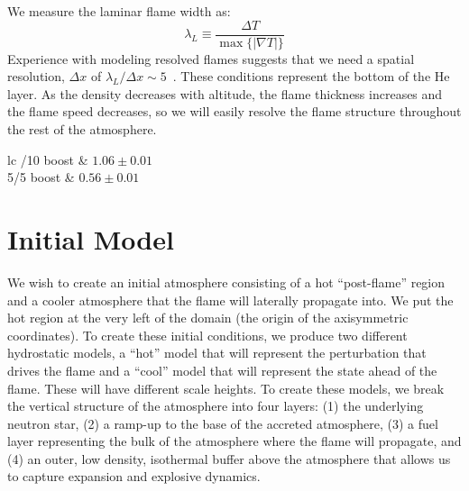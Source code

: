 \documentclass[preprint,times,tighten]{aastex63}
\begin{document}
We measure the laminar flame width as:
\begin{equation}
\lambda_L \equiv \frac{\Delta T}{\max\{|\nabla T|\}}
\end{equation}
Experience with modeling resolved flames suggests that we need a
spatial resolution, $\Delta x$ of $\lambda_L/\Delta x \sim 5$~\citep{SNld}.  These
conditions represent the bottom of the He layer.  As the density
decreases with altitude, the flame thickness increases and the flame
speed decreases, so we will easily resolve the flame structure throughout
the rest of the atmosphere.

\begin{deluxetable}{lc}
	/10 boost & $1.06 \pm 0.01$ \\
	5/5 boost & $0.56 \pm 0.01$ \\
	\enddata
\end{deluxetable}

\section{Initial Model}\label{Sec:inital_model}


We wish to create an initial atmosphere consisting of a hot
``post-flame'' region and a cooler atmosphere that the flame will
laterally propagate into.  We put the hot region at the very left of
the domain (the origin of the axisymmetric coordinates).  To create
these initial conditions, we produce two different hydrostatic models,
a ``hot'' model that will represent the perturbation that drives the
flame and a ``cool'' model that will represent the state ahead of the
flame.  These will have different scale heights.  To create these
models, we break the vertical structure of the atmosphere into four
layers: (1) the underlying neutron star, (2) a ramp-up to the base of the
accreted atmosphere, (3) a fuel layer representing the bulk of the
atmosphere where the flame will propagate, and (4) an outer, low density,
isothermal buffer above the atmosphere that allows us
to capture expansion and explosive dynamics.  
\end{document}
